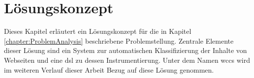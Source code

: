 \chapter{Lösungskonzept}
    \label{chapter:SolutionConcept}
    Dieses Kapitel erläutert ein Lösungskonzept für die in Kapitel \ref{chapter:ProblemAnalysis} beschriebene Problemstellung.
    Zentrale Elemente dieser Lösung sind ein System zur automatischen Klassifizierung der Inhalte von Webseiten
    und eine \gls{dsl} zu dessen Instrumentierung.
    Unter dem Namen \gls{wccs} wird im weiteren Verlauf dieser Arbeit
    Bezug auf diese Lösung genommen.

    
    
    
    
    
    
    
    
